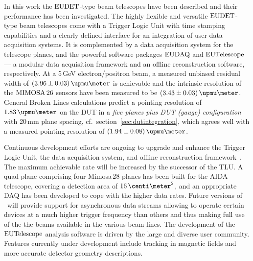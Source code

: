 

In this work the $\textrm{EUDET}$-type beam telescopes have been described and their performance has been investigated. 
The highly flexible and versatile $\textrm{EUDET}$-type beam telescopes come with a Trigger Logic Unit with time stamping capabilities and a clearly defined interface for an integration of user data acquisition systems.
It is complemented by a data acquisition system for the telescope planes, and the powerful software packages $\textrm{EUDAQ}$ and $\textrm{EUTelescope}$
 ---  a modular data acquisition framework and an offline reconstruction software, respectively. 
At a 5\,GeV electron/positron beam, a measured unbiased residual width of $(3.96 \pm 0.03)\,\upmu\meter$ is achievable
 and the intrinsic resolution of the $\textrm{MIMOSA\,26}$ sensors have been measured to be $(3.43 \pm 0.03)\,\upmu\meter$.
General Broken Lines calculations predict a pointing resolution of $1.83\,\upmu\meter$ on the DUT in a \textit{five planes plus DUT (gauge) configuration} with 20\,mm plane spacing,
 cf.~section~\ref{sec:dutintegration},
 which agrees well with a measured pointing resolution of $(1.94 \pm 0.08)\,\upmu\meter$.

Continuous development efforts are ongoing to upgrade and enhance the Trigger Logic Unit, the data acquisition system, and offline reconstruction framework~\cite{ref:tipp2014_eudaq}.  
The maximum achievable rate will be increased by the successor of the TLU. 
A quad plane comprising four Mimosa\,28 planes has been built for the AIDA telescope, covering a detection area of $16\,\centi\meter^2$, and an appropriate DAQ has been developed to cope with the higher data rates. 
Future versions of \eudaq\ will provide support for asynchronous data streams allowing to operate certain devices at a much higher trigger frequency than others
 and thus making full use of the the beams available in the various beam lines.
The development of the $\textrm{EUTelescope}$ analysis software is driven by the large and diverse user community. 
Features currently under development include tracking in magnetic fields and more accurate detector geometry descriptions. 

